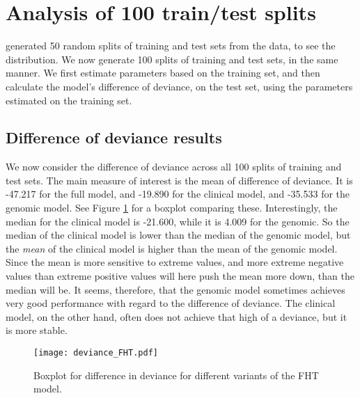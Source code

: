 


\section{Analysis of 100 train/test splits}
\citet{bovelstad2009} generated 50 random splits of training and test sets from the data, to see the distribution.
We now generate 100 splits of training and test sets, in the same manner.
We first estimate parameters based on the training set, and then calculate the model's difference of deviance, on the test set, using the parameters estimated on the training set.

\subsection{Difference of deviance results}
We now consider the difference of deviance across all 100 splits of training and test sets.
The main measure of interest is the mean of difference of deviance.
It is -47.217 for the full model, and -19.890 for the clinical model, and -35.533 for the genomic model.
See Figure \ref{fig:neuroblastoma-deviances} for a boxplot comparing these.
Interestingly, the median for the clinical model is -21.600, while it is 4.009 for the genomic.
So the median of the clinical model is lower than the median of the genomic model, but the \textit{mean} of the clinical model is higher than the mean of the genomic model.
Since the mean is more sensitive to extreme values, and more extreme negative values than extreme positive values will here push the mean more down, than the median will be.
It seems, therefore, that the genomic model sometimes achieves very good performance with regard to the difference of deviance.
The clinical model, on the other hand, often does not achieve that high of a deviance, but it is more stable.


\begin{figure}
\caption{Boxplot for difference in deviance for different variants of the FHT model.}
\label{fig:neuroblastoma-deviances}
\centering
\texttt{[image: deviance\_FHT.pdf]}
\end{figure}

